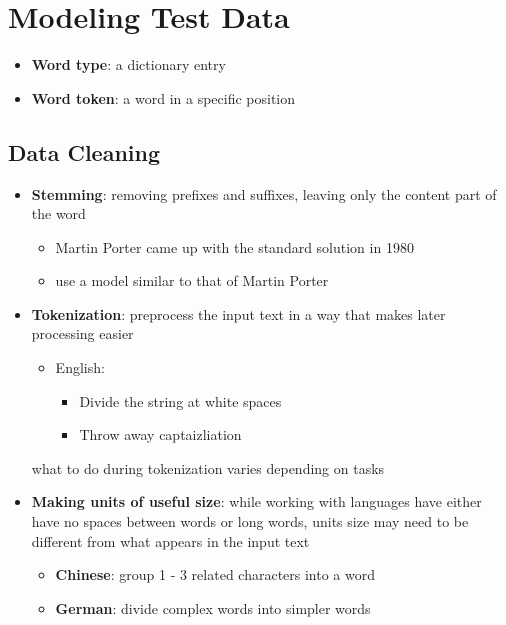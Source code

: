 \section{Modeling Test Data}

  \begin{itemize}
    \item \textbf{Word type}: a dictionary entry
    \item \textbf{Word token}: a word in a specific position
  \end{itemize}

  \subsection{Data Cleaning}

    \begin{itemize}
      \item \textbf{Stemming}: removing prefixes and suffixes, leaving only
      the content part of the word
      \begin{itemize}
        \item Martin Porter came up with the standard solution in 1980
        \item {} use a model similar to that of Martin Porter
      \end{itemize}

      \item \textbf{Tokenization}: preprocess the input text in a way that
      makes later processing easier
      \begin{itemize}
        \item English:
        \begin{itemize}
          \item Divide the string at white spaces
          \item Throw away captaizliation
        \end{itemize}
      \end{itemize}

      what to do during tokenization varies depending on tasks

      \item \textbf{Making units of useful size}: while working with languages
      have either have no spaces between words or long words, units size
      may need to be different from what appears in the input text
      \begin{itemize}
        \item \textbf{Chinese}: group 1 - 3 related characters into a word
        \item \textbf{German}: divide complex words into simpler words
      \end{itemize}
    \end{itemize}

